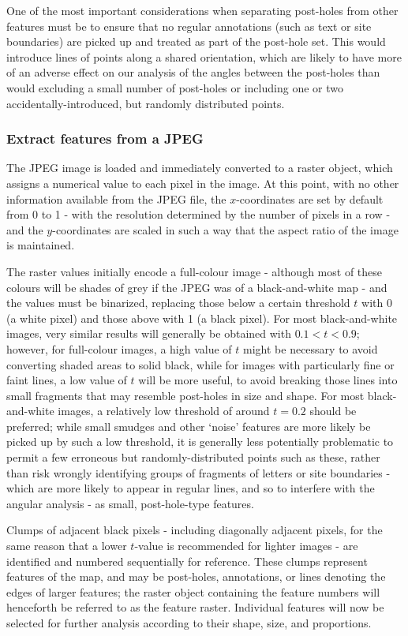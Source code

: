 \documentclass[../../ArchStats.tex]{subfiles}
\begin{document}
One of the most important considerations when separating post-holes from other features must be to ensure that no regular annotations (such as text or site boundaries) are picked up and treated as part of the post-hole set. This would introduce lines of points along a shared orientation, which are likely to have more of an adverse effect on our analysis of the angles between the post-holes than would excluding a small number of post-holes or including one or two accidentally-introduced, but randomly distributed points.



\subsubsection{Extract features from a JPEG}
\label{sec:feat-ext}
The JPEG image is loaded and immediately converted to a raster object, which assigns a numerical value to  each pixel in the image. At this point, with no other information available from the JPEG file, the $x$-coordinates are set by default from 0 to 1 - with the resolution determined by the number of pixels in a row - and the $y$-coordinates are scaled in such a way that the aspect ratio of the image is maintained.

The raster values initially encode a full-colour image - although most of these colours will be shades of grey if the JPEG was of a black-and-white map - and the values must be binarized, replacing those below a certain threshold $t$ with 0 (a white pixel) and those above with 1 (a black pixel). For most black-and-white images, very similar results will generally be obtained with $0.1 < t < 0.9$; however, for full-colour images, a high value of $t$ might be necessary to avoid converting shaded areas to solid black, while for images with particularly fine or faint lines, a low value of $t$ will be more useful, to avoid  breaking those lines into small fragments that may resemble post-holes in size and shape. For most black-and-white images, a relatively low threshold of around $t = 0.2$ should be preferred; while small smudges and other `noise' features are more likely be picked up by such a low threshold, it is generally less potentially problematic to permit a few erroneous but randomly-distributed points such as these, rather than risk wrongly identifying groups of fragments of letters or site boundaries - which are more likely to appear in regular lines, and so to interfere with the angular analysis - as small, post-hole-type features.

Clumps of adjacent black pixels - including diagonally adjacent pixels, for the same reason that a lower $t$-value is recommended for lighter images - are identified and numbered sequentially for reference. These clumps represent features of the map, and may be post-holes, annotations, or lines denoting the edges of larger features; the raster object containing the feature numbers will henceforth be referred to as the feature raster. Individual features will now be selected for further analysis according to their shape, size, and proportions.
\end{document}
